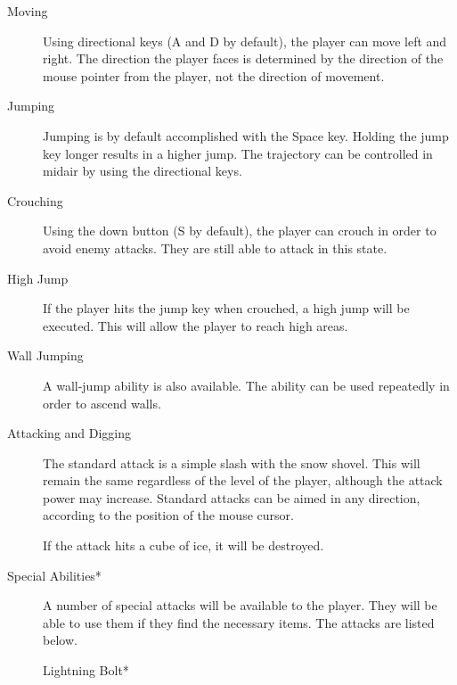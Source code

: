 \documentclass{article}
\begin{document}
\begin{description}

\item[Moving]

Using directional keys (A and D by default), the player can move left and right.  The direction the player faces is determined by the direction of the mouse pointer from the player, not the direction of movement.

\item[Jumping]

Jumping is by default accomplished with the Space key.  Holding the jump key longer results in a higher jump.  The trajectory can be controlled in midair by using the directional keys.

\item[Crouching]

Using the down button (S by default), the player can crouch in order to avoid enemy attacks.  They are still able to attack in this state.

\item[High Jump]

If the player hits the jump key when crouched, a high jump will be executed.  This will allow the player to reach high areas.

\item[Wall Jumping]

A wall-jump ability is also available.  The ability can be used repeatedly in order to ascend walls.

\item[Attacking and Digging]

The standard attack is a simple slash with the snow shovel.  This will remain the same regardless of the level of the player, although the attack power may increase.  Standard attacks can be aimed in any direction, according to the position of the mouse cursor.

If the attack hits a cube of ice, it will be destroyed.

\item[Special Abilities*]

A number of special attacks will be available to the player.  They will be able to use them if they find the necessary items.  The attacks are listed below.

\begin{description}

\item[Lightning Bolt*]


\end{description}
\end{description}
\end{document}
